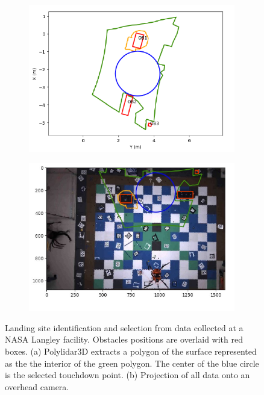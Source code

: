 \begin{figure}[ht]
    \centering
    \begin{subfigure}[t]{0.45\linewidth}
        \centering
        \includegraphics[width=0.99\textwidth]{chapter_6_experiments/imgs/experiments_1.pdf}
        \caption{}
        \label{fig:ch6_experiment_1}
    \end{subfigure}
    \begin{subfigure}[t]{0.45\linewidth}
        \centering
        \includegraphics[width=0.99\textwidth]{chapter_6_experiments/imgs/experiments_2.pdf}
        \caption{}
        \label{fig:ch6_experiment_2}
    \end{subfigure}

    \caption{Landing site identification and selection from data collected at a NASA Langley facility. Obstacles positions are overlaid with red boxes. (a) Polylidar3D extracts a polygon of the surface represented as the the interior of the green polygon. The center of the blue circle is the selected touchdown point.  (b) Projection of all data onto an overhead camera.    }
    \label{fig:ch6_experiment}
    \hfill
\end{figure}

